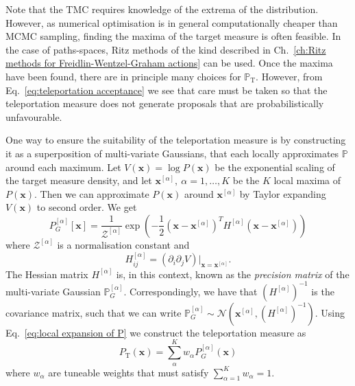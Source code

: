 Note that the TMC requires knowledge of the extrema of the distribution. However, as numerical optimisation is in general computationally cheaper than MCMC sampling, finding the maxima of the target measure is often feasible. In the case of paths-spaces, Ritz methods of the kind described in Ch.~\ref{ch:Ritz methods for Freidlin-Wentzel-Graham actions} can be used. Once the maxima have been found, there are in principle many choices for $\mathbb{P}_\text{T}$. However, from Eq.~\ref{eq:teleportation acceptance} we see that care must be taken so that the teleportation measure does not generate proposals that are probabilistically unfavourable.

One way to ensure the suitability of the teleportation measure is by constructing it as a superposition of multi-variate Gaussians, that each locally approximates $\mathbb{P}$ around each maximum. Let $V(\mathbf{x}) = \log P(\mathbf{x})$ be the exponential scaling of the target measure density, and let $\mathbf{x}^[\alpha],\ \alpha=1,\dots,K$ be the $K$ local maxima of $P(\mathbf{x})$. Then we can approximate $P(\mathbf{x})$ around $\mathbf{x}^{[\alpha]}$ by Taylor expanding $V(\mathbf{x})$ to second order. We get
\begin{equation} \label{eq:local expansion of P}
	P_G^{[\alpha]}[\mathbf{x}] = \frac{1}{\mathcal{Z}^{[\alpha]}} \exp \left( - \frac{1}{2}  ( \mathbf{x} - \mathbf{x}^{[\alpha]} )^T H^{[\alpha]} ( \mathbf{x} - \mathbf{x}^{[\alpha]} ) \right)
\end{equation}
where $\mathcal{Z}^{[\alpha]}$ is a normalisation constant and
\begin{equation}
	H^{[\alpha]}_{ij} = (\partial_i \partial_j V) |_{\mathbf{x} = \mathbf{x}^{[\alpha]} }.
\end{equation}
The Hessian matrix $H^{[\alpha]}$ is, in this context, known as the \textit{precision matrix} of the multi-variate Gaussian $\mathbb{P}_G^{[\alpha]}$. Correspondingly, we have that $(H^{[\alpha]})^{-1}$ is the covariance matrix, such that we can write $\mathbb{P}_G^{[\alpha]} \sim \mathcal{N}(\mathbf{x}^{[\alpha]}, (H^{[\alpha]})^{-1})$. Using Eq.~\ref{eq:local expansion of P} we construct the teleportation measure as
\begin{equation} \label{eq:teleportation measures mixed gaussian}
	P_\text{T}(\mathbf{x}) = \sum_\alpha^{K} w_\alpha P_G^{[\alpha]}(\mathbf{x})
\end{equation}
where $w_\alpha$ are tuneable weights that must satisfy $\sum_{\alpha=1}^{K}w_{\alpha}=1$.

